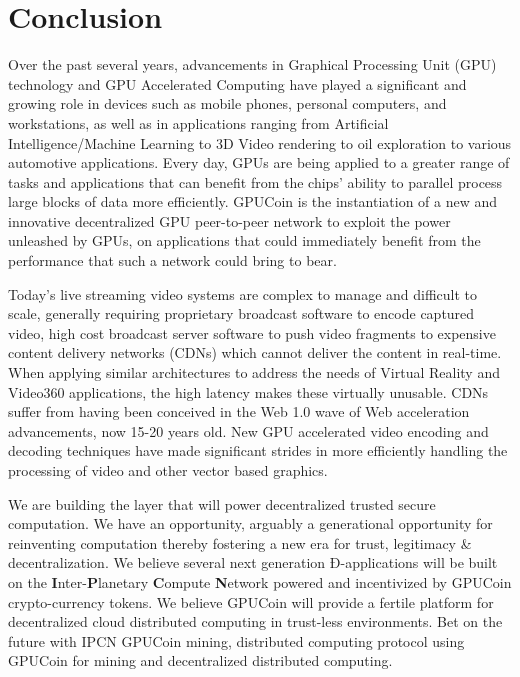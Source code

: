 \documentclass{article}
\begin{document}
\section{Conclusion}

Over the past several years, advancements in Graphical Processing Unit (GPU) technology and GPU Accelerated Computing have played a significant and growing role in devices such as mobile phones, personal computers, and workstations, as well as in applications ranging from Artificial Intelligence/Machine Learning to 3D Video rendering to oil exploration to various automotive applications.  Every day, GPUs are being applied to a greater range of tasks and applications that can benefit from the chips’ ability to parallel process large blocks of data more efficiently.  GPUCoin is the instantiation of a new and innovative decentralized GPU peer-to-peer network to exploit the power unleashed by GPUs, on applications that could immediately benefit from the performance that such a network could bring to bear.  

Today’s live streaming video systems are complex to manage and difficult to scale, generally requiring proprietary broadcast software to encode captured video, high cost broadcast server software to push video fragments to expensive content delivery networks (CDNs) which cannot deliver the content in real-time.  When applying similar architectures to address the needs of Virtual Reality and Video360 applications, the high latency makes these virtually unusable.  CDNs suffer from having been conceived in the Web 1.0 wave of Web acceleration advancements, now 15-20 years old.  New GPU accelerated video encoding and decoding techniques have made significant strides in more efficiently handling the processing of video and other vector based graphics.  

We are building the layer that will power decentralized trusted secure computation. We have an opportunity, arguably a generational opportunity for reinventing computation thereby fostering a new era for trust, legitimacy \& decentralization. We believe several next generation Ð-applications will be built on the \textbf{I}nter-\textbf{P}lanetary \textbf{C}ompute \textbf{N}etwork powered and incentivized by GPUCoin crypto-currency tokens. We believe GPUCoin will provide a fertile platform for decentralized cloud distributed computing in trust-less environments. Bet on the future with IPCN GPUCoin mining, distributed computing protocol using GPUCoin for mining and decentralized distributed computing.
\end{document}
